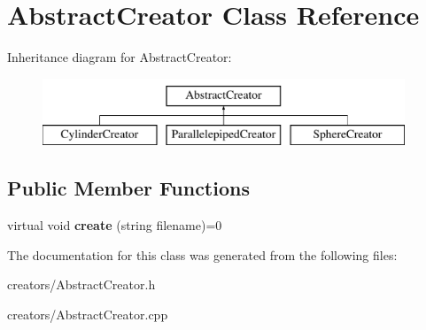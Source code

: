 \hypertarget{class_abstract_creator}{}\section{Abstract\+Creator Class Reference}
\label{class_abstract_creator}
Inheritance diagram for Abstract\+Creator\+:\begin{figure}[H]
\begin{center}
\leavevmode
\includegraphics[height=2.000000cm]{class_abstract_creator}
\end{center}
\end{figure}
\subsection*{Public Member Functions}
\begin{DoxyCompactItemize}
\item 
\mbox{\label{class_abstract_creator_a1991e446444ffea2b85216b64f2dcf9e}} 
virtual void {\bfseries create} (string filename)=0
\end{DoxyCompactItemize}


The documentation for this class was generated from the following files\+:\begin{DoxyCompactItemize}
\item 
creators/Abstract\+Creator.\+h\item 
creators/Abstract\+Creator.\+cpp\end{DoxyCompactItemize}
